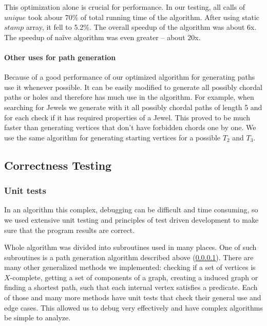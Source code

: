 This optimization alone is crucial for performance. In our testing, all calls of $unique$ took abour 70\% of total running time of the algorithm. After using static $stamp$ array, it fell to 5.2\%. The overall speedup of the algorithm was about 6x.  The speedup of na\"ive algorithm was even greater -- about 20x.

\paragraph{Other uses for path generation}
\label{sec:usesGeneration}

Because of a good performance of our optimized algorithm for generating paths use it whenever possible. It can be easily modified to generate all possibly chordal paths or holes and therefore has much use in the algorithm. For example, when searching for Jewels we generate with it all possibly chordal paths of length 5 and for each check if it has required properties of a Jewel. This proved to be much faster than generating vertices that don't have forbidden chords one by one. We use the same algorithm for generating starting vertices for a possible $T_2$ and $T_3$.


\subsection{Correctness Testing}

\subsubsection{Unit tests}

In an algorithm this complex, debugging can be difficult and time consuming, so we used extensive unit testing and principles of test driven development to make sure that the program results are correct.

Whole algorithm was divided into subroutines used in many places. One of such subroutines is a path generation algorithm described above (\cref{sec:usesGeneration}). There are many other generalized methods we implemented: checking if a set of vertices is $X$-complete, getting a set of components of a graph, creating a induced graph or finding a shortest path, such that each internal vertex satisfies a predicate. Each of those and many more methods have unit tests that check their general use and edge cases. This allowed us to debug very effectively and have complex algorithms be simple to analyze.

